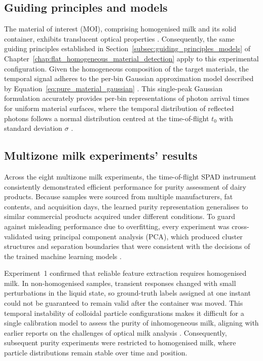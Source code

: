 \documentclass[12pt,a4paper,oneside]{report}
\begin{document}
\subsection{Guiding principles and models}
\label{subsec:guiding_principles_models_chapter6}

The material of interest (MOI), comprising homogenised milk and its solid container, exhibits translucent optical properties \cite{walstra1999,klocek1991}. Consequently, the same guiding principles established in Section~\ref{subsec:guiding_principles_models} of Chapter~\ref{chap:flat_homogeneous_material_detection} apply to this experimental configuration. Given the homogeneous composition of the target materials, the temporal signal adheres to the per-bin Gaussian approximation model described by Equation~\eqref{eq:pure_material_gaussian} \cite{tontini2020,koerner2021,su2016}. This single-peak Gaussian formulation accurately provides per-bin representations of photon arrival times for uniform material surfaces, where the temporal distribution of reflected photons follows a normal distribution centred at the time-of-flight $t_0$ with standard deviation $\sigma$ \cite{becker2023,nielsen2013}.


\subsection{Multizone milk experiments' results}
\label{subsec:multizone_experiment_results_chapter6}

Across the eight multizone milk experiments, the time-of-flight SPAD instrument consistently demonstrated efficient performance for purity assessment of dairy products. Because samples were sourced from multiple manufacturers, fat contents, and acquisition days, the learned purity representation generalises to similar commercial products acquired under different conditions. To guard against misleading performance due to overfitting, every experiment was cross-validated using principal component analysis (PCA), which produced cluster structures and separation boundaries that were consistent with the decisions of the trained machine learning models \cite{wold1987}.

Experiment~1 confirmed that reliable feature extraction requires homogenised milk. In non-homogenised samples, transient responses changed with small perturbations in the liquid state, so ground-truth labels assigned at one instant could not be guaranteed to remain valid after the container was moved. This temporal instability of colloidal particle configurations makes it difficult for a single calibration model to assess the purity of inhomogeneous milk, aligning with earlier reports on the challenges of optical milk analysis \cite{aernouts2015,melfsen2012,walstra1999}. Consequently, subsequent purity experiments were restricted to homogenised milk, where particle distributions remain stable over time and position.
\end{document}
